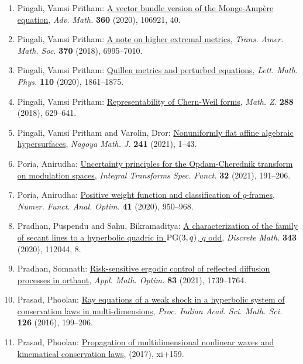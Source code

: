 \begin{enumerate}
\item Pingali, Vamsi Pritham: \href{https://doi.org/10.1016/j.aim.2019.106921}{A vector bundle version of the {M}onge-{A}mp\`ere equation}, \emph{Adv. Math.} {\bf 360} (2020), 106921, 40.
\item Pingali, Vamsi Pritham: \href{https://doi.org/10.1090/tran/7416}{A note on higher extremal metrics}, \emph{Trans. Amer. Math. Soc.} {\bf 370} (2018), 6995--7010.
\item Pingali, Vamsi Pritham: \href{https://doi.org/10.1007/s11005-020-01279-9}{Quillen metrics and perturbed equations}, \emph{Lett. Math. Phys.} {\bf 110} (2020), 1861--1875.
\item Pingali, Vamsi Pritham: \href{https://doi.org/10.1007/s00209-017-1903-2}{Representability of {C}hern-{W}eil forms}, \emph{Math. Z.} {\bf 288} (2018), 629--641.
\item Pingali, Vamsi Pritham and Varolin, Dror: \href{https://doi.org/10.1017/nmj.2019.2}{Nonuniformly flat affine algebraic hypersurfaces}, \emph{Nagoya Math. J.} {\bf 241} (2021), 1--43.
\item Poria, Anirudha: \href{https://doi.org/10.1080/10652469.2020.1813129}{Uncertainty principles for the {O}pdam-{C}herednik transform
on modulation spaces}, \emph{Integral Transforms Spec. Funct.} {\bf 32} (2021), 191--206.
\item Poria, Anirudha: \href{https://doi.org/10.1080/01630563.2020.1728771}{Positive weight function and classification of {$g$}-frames}, \emph{Numer. Funct. Anal. Optim.} {\bf 41} (2020), 950--968.
\item Pradhan, Puspendu and Sahu, Bikramaditya: \href{https://doi.org/10.1016/j.disc.2020.112044}{A characterization of the family of secant lines to a
hyperbolic quadric in {${\rm PG} (3,q)$}, {$q$} odd}, \emph{Discrete Math.} {\bf 343} (2020), 112044, 8.
\item Pradhan, Somnath: \href{https://doi.org/10.1007/s00245-019-09606-w}{Risk-sensitive ergodic control of reflected diffusion
processes in orthant}, \emph{Appl. Math. Optim.} {\bf 83} (2021), 1739--1764.
\item Prasad, Phoolan: \href{https://doi.org/10.1007/s12044-016-0275-6}{Ray equations of a weak shock in a hyperbolic system of
conservation laws in multi-dimensions}, \emph{Proc. Indian Acad. Sci. Math. Sci.} {\bf 126} (2016), 199--206.
\item Prasad, Phoolan: \href{https://doi.org/10.1007/978-981-10-7581-0}{Propagation of multidimensional nonlinear waves and
kinematical conservation laws}, \emph{} {\bf } (2017), xi+159.

\end{enumerate}
